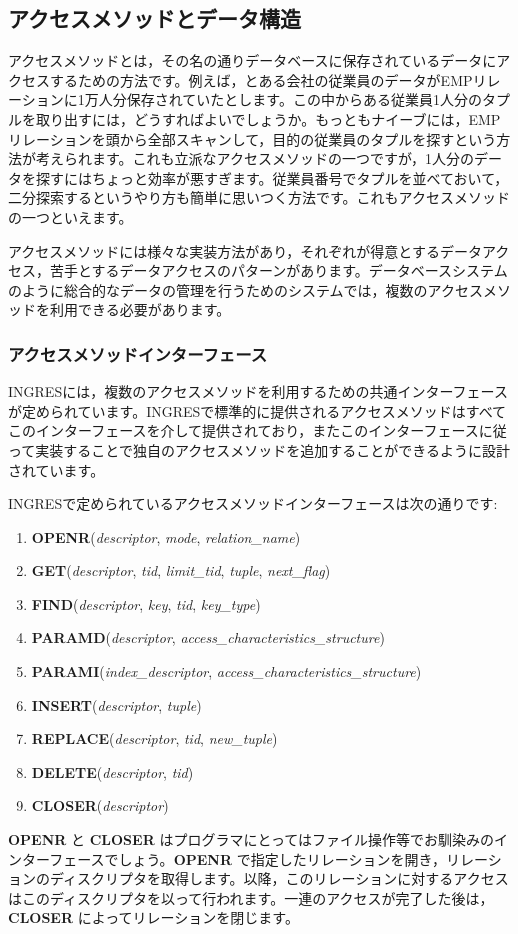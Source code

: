 \subsection{アクセスメソッドとデータ構造}


アクセスメソッドとは，その名の通りデータベースに保存されているデータにアクセスするための方法です。例えば，とある会社の従業員のデータがEMPリレーションに1万人分保存されていたとします。この中からある従業員1人分のタプルを取り出すには，どうすればよいでしょうか。もっともナイーブには，EMPリレーションを頭から全部スキャンして，目的の従業員のタプルを探すという方法が考えられます。これも立派なアクセスメソッドの一つですが，1人分のデータを探すにはちょっと効率が悪すぎます。従業員番号でタプルを並べておいて，二分探索するというやり方も簡単に思いつく方法です。これもアクセスメソッドの一つといえます。


アクセスメソッドには様々な実装方法があり，それぞれが得意とするデータアクセス，苦手とするデータアクセスのパターンがあります。データベースシステムのように総合的なデータの管理を行うためのシステムでは，複数のアクセスメソッドを利用できる必要があります。


\subsubsection{アクセスメソッドインターフェース}


INGRESには，複数のアクセスメソッドを利用するための共通インターフェースが定められています。INGRESで標準的に提供されるアクセスメソッドはすべてこのインターフェースを介して提供されており，またこのインターフェースに従って実装することで独自のアクセスメソッドを追加することができるように設計されています。


INGRESで定められているアクセスメソッドインターフェースは次の通りです:
\begin{enumerate}
 \item {\bf OPENR}({\it descriptor}, {\it mode}, {\it relation\_name})
 \item {\bf GET}({\it descriptor}, {\it tid}, {\it limit\_tid}, {\it
       tuple}, {\it next\_flag})
 \item {\bf FIND}({\it descriptor}, {\it key}, {\it tid}, {\it key\_type})
 \item {\bf PARAMD}({\it descriptor}, {\it access\_characteristics\_structure})
 \item {\bf PARAMI}({\it index\_descriptor}, {\it access\_characteristics\_structure})
 \item {\bf INSERT}({\it descriptor}, {\it tuple})
 \item {\bf REPLACE}({\it descriptor}, {\it tid}, {\it new\_tuple})
 \item {\bf DELETE}({\it descriptor}, {\it tid})
 \item {\bf CLOSER}({\it descriptor})
\end{enumerate}
{\bf OPENR} と {\bf CLOSER} はプログラマにとってはファイル操作等でお馴染みのインターフェースでしょう。{\bf OPENR} で指定したリレーションを開き，リレーションのディスクリプタを取得します。以降，このリレーションに対するアクセスはこのディスクリプタを以って行われます。一連のアクセスが完了した後は，{\bf CLOSER} によってリレーションを閉じます。


